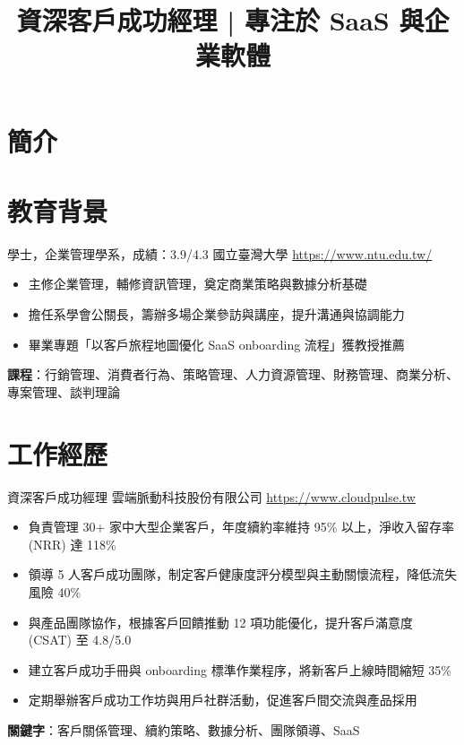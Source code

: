 \documentclass[a4paper, serif, 10pt]{moderncv}
\title{資深客戶成功經理 | 專注於 SaaS 與企業軟體}
\begin{document}
\maketitle

\section{簡介}

\section{教育背景}

        {學士，企業管理學系，成績：3.9/4.3}
        {國立臺灣大學}
        {\url{https://www.ntu.edu.tw/}}
        {}
        {\begin{itemize}
\item 主修企業管理，輔修資訊管理，奠定商業策略與數據分析基礎
\item 擔任系學會公關長，籌辦多場企業參訪與講座，提升溝通與協調能力
\item 畢業專題「以客戶旅程地圖優化 SaaS onboarding 流程」獲教授推薦
\end{itemize}
\textbf{課程}：行銷管理、消費者行為、策略管理、人力資源管理、財務管理、商業分析、專案管理、談判理論}
\section{工作經歷}

        {資深客戶成功經理}
        {雲端脈動科技股份有限公司}
        {\url{https://www.cloudpulse.tw}}
        {}
        {\begin{itemize}
\item 負責管理 30+ 家中大型企業客戶，年度續約率維持 95\% 以上，淨收入留存率 (NRR) 達 118\%
\item 領導 5 人客戶成功團隊，制定客戶健康度評分模型與主動關懷流程，降低流失風險 40\%
\item 與產品團隊協作，根據客戶回饋推動 12 項功能優化，提升客戶滿意度 (CSAT) 至 4.8/5.0
\item 建立客戶成功手冊與 onboarding 標準作業程序，將新客戶上線時間縮短 35\%
\item 定期舉辦客戶成功工作坊與用戶社群活動，促進客戶間交流與產品採用
\end{itemize}
\textbf{關鍵字}：客戶關係管理、續約策略、數據分析、團隊領導、SaaS}
\end{document}
